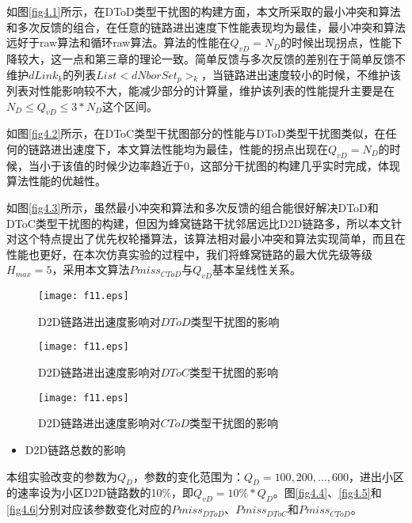 \documentclass[figurelist,tablelist,algorithmlist,nomlist,masters]{seuthesix}
\begin{document}
	如图\ref{fig4.1}所示，在DToD类型干扰图的构建方面，本文所采取的最小冲突和算法和多次反馈的组合，在任意的链路进出速度下性能表现均为最佳，最小冲突和算法远好于raw算法和循环raw算法。算法的性能在$Q_{vD} = N_D$的时候出现拐点，性能下降较大，这一点和第三章的理论一致。简单反馈与多次反馈的差别在于简单反馈不维护$dLink_k$的列表$List < dNborSet_{p}{ > _k}$，当链路进出速度较小的时候，不维护该列表对性能影响较不大，能减少部分的计算量，维护该列表的性能提升主要是在$N_D \le Q_{vD} \le 3 * N_D$这个区间。

	如图\ref{fig4.2}所示，在DToC类型干扰图部分的性能与DToD类型干扰图类似，在任何的链路进出速度下，本文算法性能均为最佳，性能的拐点出现在$Q_{vD} = N_D$的时候，当小于该值的时候少边率趋近于0，这部分干扰图的构建几乎实时完成，体现算法性能的优越性。

	如图\ref{fig4.3}所示，虽然最小冲突和算法和多次反馈的组合能很好解决DToD和DToC类型干扰图的构建，但因为蜂窝链路干扰邻居远比D2D链路多，所以本文针对这个特点提出了优先权轮播算法，该算法相对最小冲突和算法实现简单，而且在性能也更好，在本次仿真实验的过程中，我们将蜂窝链路的最大优先级等级$H_{max} = 5$，采用本文算法$Pmiss_{CToD}$与$Q_{vD}$基本呈线性关系。
	
	
	\begin{figure}[!h]
		\centering
		\texttt{[image: f11.eps]}
		\caption{D2D链路进出速度影响对$DToD$类型干扰图的影响}
		\label{f11}
	\end{figure}
	
	\begin{figure}[!h]
		\centering
		\texttt{[image: f11.eps]}
		\caption{D2D链路进出速度影响对$DToC$类型干扰图的影响}
		\label{f11}
	\end{figure}

	\begin{figure}[!h]
		\centering
		\texttt{[image: f11.eps]}
		\caption{D2D链路进出速度影响对$CToD$类型干扰图的影响}
		\label{f11}
	\end{figure}
	
	\begin{itemize}
		\item D2D链路总数的影响
	\end{itemize}

	本组实验改变的参数为$Q_{D}$，参数的变化范围为：$Q_{D} = 100,200,...,600$，进出小区的速率设为小区D2D链路数的10\%，即$Q_{vD} = 10\% * Q_{D}$。图\ref{fig4.4}、\ref{fig4.5}和\ref{fig4.6}分别对应该参数变化对应的$Pmiss_{DToD}$、$Pmiss_{DToC}$和$Pmiss_{CToD}$。
\end{document}
